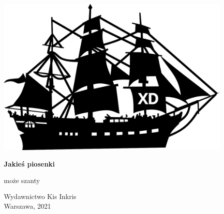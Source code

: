 \documentclass{book}
\begin{document}
\begin{titlepage}
    \begin{center}
        \vspace*{7cm}
        
        \includegraphics[height=8cm]{front-obrazek.png}

        \vspace{1cm}

        \Huge\textbf{Jakieś piosenki}

        \vspace{0.5cm}

        \LARGE{może szanty}

        \vfill

        \Large
        Wydawnictwo Kis Inkris \\
        Warszawa, 2021
    \end{center}
\end{titlepage}


\end{document}
